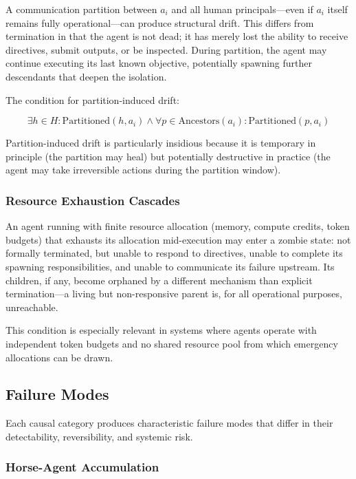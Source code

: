 A communication partition between $a_i$ and all human principals—even if $a_i$ itself remains fully operational—can produce structural drift. This differs from termination in that the agent is not dead; it has merely lost the ability to receive directives, submit outputs, or be inspected. During partition, the agent may continue executing its last known objective, potentially spawning further descendants that deepen the isolation.

The condition for partition-induced drift:

\[
\exists h \in H : \text{Partitioned}(h, a_i) \land \forall p \in \text{Ancestors}(a_i) : \text{Partitioned}(p, a_i)
\]

Partition-induced drift is particularly insidious because it is temporary in principle (the partition may heal) but potentially destructive in practice (the agent may take irreversible actions during the partition window).

\subsubsection{Resource Exhaustion Cascades}

An agent running with finite resource allocation (memory, compute credits, token budgets) that exhausts its allocation mid-execution may enter a zombie state: not formally terminated, but unable to respond to directives, unable to complete its spawning responsibilities, and unable to communicate its failure upstream. Its children, if any, become orphaned by a different mechanism than explicit termination—a living but non-responsive parent is, for all operational purposes, unreachable.

This condition is especially relevant in systems where agents operate with independent token budgets and no shared resource pool from which emergency allocations can be drawn.

\subsection{Failure Modes}

Each causal category produces characteristic failure modes that differ in their detectability, reversibility, and systemic risk.

\subsubsection{Horse-Agent Accumulation}

